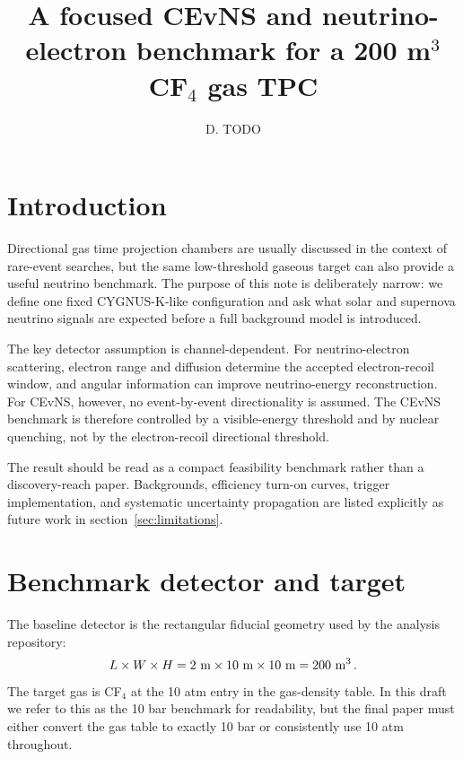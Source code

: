 \documentclass[a4paper,11pt]{article}
\title{\boldmath A focused CEvNS and neutrino-electron benchmark for a 200 m$^3$ CF$_4$ gas TPC}
\author{D. TODO}
\affiliation{TODO institution,\\
TODO address, Country}
\begin{document}
\maketitle
\flushbottom

\section{Introduction}
\label{sec:introduction}

Directional gas time projection chambers are usually discussed in the context
of rare-event searches, but the same low-threshold gaseous target can also
provide a useful neutrino benchmark. The purpose of this note is deliberately
narrow: we define one fixed CYGNUS-K-like configuration and ask what solar and
supernova neutrino signals are expected before a full background model is
introduced.

The key detector assumption is channel-dependent. For neutrino-electron
scattering, electron range and diffusion determine the accepted electron-recoil
window, and angular information can improve neutrino-energy reconstruction. For
CEvNS, however, no event-by-event directionality is assumed. The CEvNS
benchmark is therefore controlled by a visible-energy threshold and by nuclear
quenching, not by the electron-recoil directional threshold.

The result should be read as a compact feasibility benchmark rather than a
discovery-reach paper. Backgrounds, efficiency turn-on curves, trigger
implementation, and systematic uncertainty propagation are listed explicitly as
future work in section~\ref{sec:limitations}.

\section{Benchmark detector and target}
\label{sec:benchmark}

The baseline detector is the rectangular fiducial geometry used by the analysis
repository:
\begin{equation}
L \times W \times H = 2~{\rm m} \times 10~{\rm m} \times 10~{\rm m}
= 200~{\rm m}^3 \, .
\end{equation}
The target gas is CF$_4$ at the 10 atm entry in the gas-density table. In this
draft we refer to this as the 10 bar benchmark for readability, but the final
paper must either convert the gas table to exactly 10 bar or consistently use
10 atm throughout.
\end{document}
